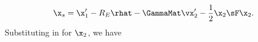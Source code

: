\begin{equation}
\x_s = \x'_1 - R_E\rhat -  \GammaMat\vx'_2 - \frac{1}{2}\x_2 \sF \x_2.
\end{equation}
Substituting in for $\x_2$, we have
  